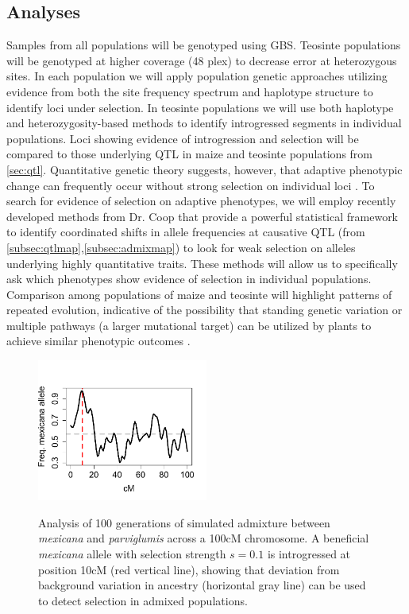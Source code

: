 \subsection{Analyses}
Samples from all populations will be genotyped using GBS.  Teosinte populations will be genotyped at higher coverage (48 plex) to decrease error at heterozygous sites. In each population we will apply population genetic approaches utilizing evidence from both the site frequency spectrum \citep{nielsen2005genomic} and haplotype structure \citep{voight2006map} to identify loci under selection.  In teosinte populations we will use both haplotype \citep{price2009sensitive} and heterozygosity-based \citep{Geneva2014} methods to identify introgressed segments in individual populations.  Loci showing evidence of introgression and selection will be compared to those underlying QTL in maize and teosinte populations from \ref{sec:qtl}.  Quantitative genetic theory suggests, however, that adaptive phenotypic change can frequently occur without strong selection on individual loci \citep{le2012genetic}.  To search for evidence of selection on adaptive phenotypes, we will employ recently developed methods from Dr. Coop \citep{Berg2013} that provide a powerful statistical framework to identify coordinated shifts in allele frequencies at causative QTL (from \ref{subsec:qtlmap},\ref{subsec:admixmap}) to look for weak selection on alleles underlying highly quantitative traits. These methods will allow us to specifically ask which phenotypes show evidence of selection in individual populations.  Comparison among populations of maize and teosinte will highlight patterns of repeated evolution, indicative of the possibility that standing genetic variation or multiple pathways (a larger mutational target) can be utilized by plants to achieve similar phenotypic outcomes \citep{Ralph2010a}.

\begin{figure}
  \centering
  \caption{Analysis of 100 generations of simulated admixture between \emph{mexicana} and \emph{parviglumis} across a 100cM chromosome.   A  beneficial \emph{mexicana} allele with selection strength $s=0.1$ is introgressed at position 10cM (red vertical line), showing that  deviation from background variation in ancestry (horizontal gray line) can be used to detect selection in admixed populations. } 
   \includegraphics[width=0.5\textwidth]{admix.pdf}
\label{fig:yaniv}
\end{figure}

